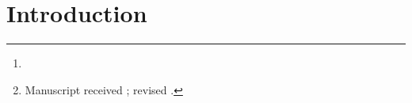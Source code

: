 \documentclass[journal,onecolumn]{IEEEtran}
\begin{document}
\title{}

\author{%
  ~\IEEEmembership{}%
\thanks{}%
\thanks{Manuscript received ; revised .}}

\markboth{}%
{}



\maketitle

\begin{abstract}

\end{abstract}

\begin{IEEEkeywords}

\end{IEEEkeywords}


\IEEEpeerreviewmaketitle

\section{Introduction}
\end{document}
